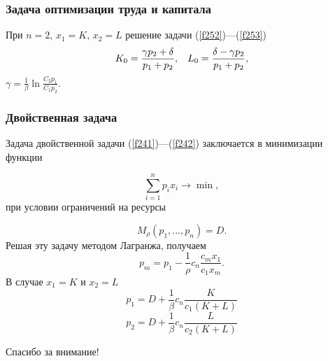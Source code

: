 \documentclass[10pt, pdf, hyperref={unicode}]{beamer}
\begin{document}
    \begin{frame}
        \frametitle{Задача оптимизации труда и капитала}
        \begin{center}
            \begin{minipage}[h]{0.97\linewidth}
                При $n=2$, $x_1=K$, $x_2=L$ решение задачи (\ref{f252})---(\ref{f253})
                \begin{equation}\label{f254}
                K_0=\frac{\gamma p_2+\delta}{p_1+p_2},\hspace{3mm}L_0=\frac{\delta-\gamma p_2}{p_1+p_2},
                \end{equation}
                $\gamma=\frac1\beta\ln\frac{C_2p_1}{C_1p_2}$.
            \end{minipage}
        \end{center}
    \end{frame}

    \begin{frame}
        \frametitle{Двойственная задача}
        \begin{center}
            \begin{minipage}[h]{0.97\linewidth}
                Задача двойственной задачи (\ref{f241})---(\ref{f242}) заключается в минимизации функции

                \begin{equation}\label{f261}
                \sum_{i=1}^{n}p_{i}x_{i}\rightarrow\min,
                \end{equation}
                при условии ограничений на ресурсы
                
                \begin{equation}\label{f262}
                M_{\rho}(p_1,...,p_n)=D.
                \end{equation}
                Решая эту задачу методом Лагранжа, получаем
                \begin{equation}\label{f267}
                    p_m=p_1-\frac{1}{\rho}c_n\frac{c_m x_1}{c_1x_m}.
                \end{equation}
                В случае $x_1=K$ и $x_2=L$
                $$p_1=D+\frac{1}{\beta}c_n \frac{K}{c_1(K+L)}$$
                $$p_2=D+\frac{1}{\beta}c_n \frac{L}{c_2(K+L)}$$
            \end{minipage}
        \end{center}
    \end{frame}

    \begin{frame}
        \begin{alertblock}{}
            \centerline{\large Спасибо за внимание!}
        \end{alertblock}
    \end{frame}
\end{document}
